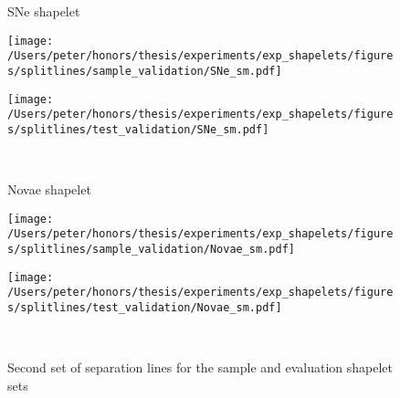 \begin{figure}[ht!]
\begin{minipage}[c]{\textwidth}
		\begin{minipage}[c]{\textwidth}
			\begin{minipage}[c]{0.15\textwidth}
				\centering
				SNe shapelet
			\end{minipage}
			\begin{minipage}[c]{0.4\textwidth}
				\centering
			\texttt{[image: /Users/peter/honors/thesis/experiments/exp\_shapelets/figures/splitlines/sample\_validation/SNe\_sm.pdf]}
			\end{minipage}
			\begin{minipage}[c]{0.40\textwidth}
				\centering
			\texttt{[image: /Users/peter/honors/thesis/experiments/exp\_shapelets/figures/splitlines/test\_validation/SNe\_sm.pdf]}
			\end{minipage}
		\end{minipage} \\
		
		\begin{minipage}[c]{\textwidth}
			\begin{minipage}[c]{0.15\textwidth}
				\centering
				Novae shapelet
			\end{minipage}
			\begin{minipage}[c]{0.40\textwidth}
				\centering
			\texttt{[image: /Users/peter/honors/thesis/experiments/exp\_shapelets/figures/splitlines/sample\_validation/Novae\_sm.pdf]}
			\end{minipage}
			\begin{minipage}[c]{0.40\textwidth}
				\centering
			\texttt{[image: /Users/peter/honors/thesis/experiments/exp\_shapelets/figures/splitlines/test\_validation/Novae\_sm.pdf]}
			\end{minipage}
		\end{minipage} \\
	\end{minipage}
	\caption{Second set of separation lines for the sample and evaluation shapelet sets}
\end{figure}
\clearpage

